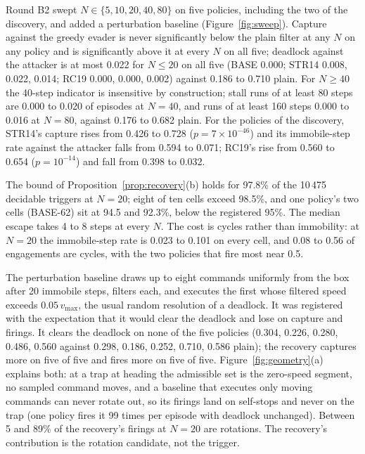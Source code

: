 \documentclass{l4dc2027}
\newcommand{\vmax}{v_{\max}}
\begin{document}
Round B2 swept $N \in \{5,10,20,40,80\}$ on five policies, including the two of the discovery, and added a perturbation baseline (Figure~\ref{fig:sweep}). Capture against the greedy evader is never significantly below the plain filter at any $N$ on any policy and is significantly above it at every $N$ on all five; deadlock against the attacker is at most 0.022 for $N \le 20$ on all five (BASE 0.000; STR14 0.008, 0.022, 0.014; RC19 0.000, 0.000, 0.002) against 0.186 to 0.710 plain. For $N \ge 40$ the 40-step indicator is insensitive by construction; stall runs of at least 80 steps are 0.000 to 0.020 of episodes at $N = 40$, and runs of at least 160 steps 0.000 to 0.016 at $N = 80$, against 0.176 to 0.682 plain. For the policies of the discovery, STR14's capture rises from 0.426 to 0.728 ($p = 7\times10^{-46}$) and its immobile-step rate against the attacker falls from 0.594 to 0.071; RC19's rise from 0.560 to 0.654 ($p = 10^{-14}$) and fall from 0.398 to 0.032.

The bound of Proposition~\ref{prop:recovery}(b) holds for 97.8\% of the 10\,475 decidable triggers at $N = 20$; eight of ten cells exceed 98.5\%, and one policy's two cells (BASE-62) sit at 94.5 and 92.3\%, below the registered 95\%. The median escape takes 4 to 8 steps at every $N$. The cost is cycles rather than immobility: at $N = 20$ the immobile-step rate is 0.023 to 0.101 on every cell, and 0.08 to 0.56 of engagements are cycles, with the two policies that fire most near 0.5.

The perturbation baseline draws up to eight commands uniformly from the box after 20 immobile steps, filters each, and executes the first whose filtered speed exceeds $0.05\,\vmax$, the usual random resolution of a deadlock. It was registered with the expectation that it would clear the deadlock and lose on capture and firings. It clears the deadlock on none of the five policies (0.304, 0.226, 0.280, 0.486, 0.560 against 0.298, 0.186, 0.252, 0.710, 0.586 plain); the recovery captures more on five of five and fires more on five of five. Figure~\ref{fig:geometry}(a) explains both: at a trap at heading the admissible set is the zero-speed segment, no sampled command moves, and a baseline that executes only moving commands can never rotate out, so its firings land on self-stops and never on the trap (one policy fires it 99 times per episode with deadlock unchanged). Between 5 and 89\% of the recovery's firings at $N = 20$ are rotations. The recovery's contribution is the rotation candidate, not the trigger.
\end{document}
